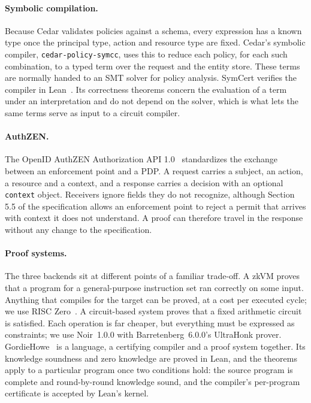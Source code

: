 \documentclass[11pt]{article}
\begin{document}
\paragraph{Symbolic compilation.} Because Cedar validates policies against a schema, every expression has a known type once the principal type, action and resource type are fixed. Cedar's symbolic compiler, \texttt{cedar-policy-symcc}, uses this to reduce each policy, for each such combination, to a typed term over the request and the entity store. These terms are normally handed to an SMT solver for policy analysis. SymCert verifies the compiler in Lean~\citep{torlak2026symcert}. Its correctness theorems concern the evaluation of a term under an interpretation and do not depend on the solver, which is what lets the same terms serve as input to a circuit compiler.

\paragraph{AuthZEN.} The OpenID AuthZEN Authorization API 1.0~\citep{authzen2026final} standardizes the exchange between an enforcement point and a PDP. A request carries a subject, an action, a resource and a context, and a response carries a decision with an optional \texttt{context} object. Receivers ignore fields they do not recognize, although Section 5.5 of the specification allows an enforcement point to reject a permit that arrives with context it does not understand. A proof can therefore travel in the response without any change to the specification.

\paragraph{Proof systems.} The three backends sit at different points of a familiar trade-off. A zkVM proves that a program for a general-purpose instruction set ran correctly on some input. Anything that compiles for the target can be proved, at a cost per executed cycle; we use RISC Zero~\citep{bruestle2023risczero}. A circuit-based system proves that a fixed arithmetic circuit is satisfied. Each operation is far cheaper, but everything must be expressed as constraints; we use Noir~1.0.0 with Barretenberg~6.0.0's UltraHonk prover. GordieHowe~\citep{sharp2026gordiehowe} is a language, a certifying compiler and a proof system together. Its knowledge soundness and zero knowledge are proved in Lean, and the theorems apply to a particular program once two conditions hold: the source program is complete and round-by-round knowledge sound, and the compiler's per-program certificate is accepted by Lean's kernel.
\end{document}
